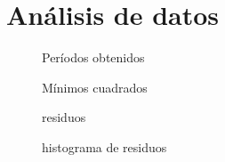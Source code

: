 \section{Análisis de datos}

\begin{figure}[H]
    \centering
    
    \caption{Períodos obtenidos}
\end{figure}

\begin{figure}[H]
    \centering
    
    \caption{Mínimos cuadrados}
\end{figure}

\begin{figure}[H]
    \centering
    
    \caption{residuos}
\end{figure}

\begin{figure}[H]
    \centering
    
    \caption{histograma de residuos}
\end{figure}
